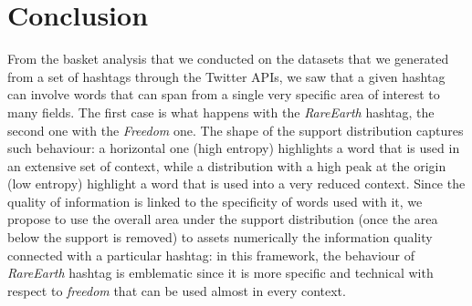 \documentclass[12pt,%
               a4paper,%
               oneside,openany,%
               titlepage,%
               headinclude,footinclude,%
               BCOR5mm,%
               cleardoublepage=empty,%
               tablecaptionabove,%
               floatperchapter,
               ]{scrreprt}                 %
\begin{document}
\chapter{Conclusion}
From the basket analysis that we conducted on the datasets that we generated from a set of hashtags through the Twitter APIs, we saw that a given hashtag can involve words that can span from a single very specific area of interest to many fields. The first case is what happens with the  \textit{RareEarth} hashtag, the second one with the \textit{Freedom} one. The shape of the support distribution captures such behaviour: a horizontal one (high entropy) highlights a word that is used in an extensive set of context, while a distribution with a high peak at the origin (low entropy) highlight a word that is used into a very reduced context. Since the quality of information is linked to the specificity of words used with it, we propose to use the overall area under the support distribution (once the area below the support is removed) to assets numerically the information quality connected with a particular hashtag: in this framework, the behaviour of \textit{RareEarth} hashtag is emblematic since it is more specific and technical with respect to \textit{freedom} that can be used almost in every context.






\newpage




\end{document}
